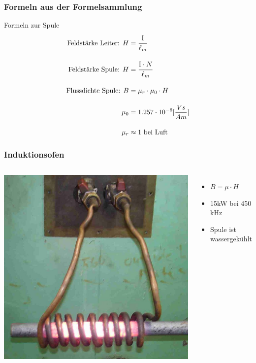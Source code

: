 \begin{frame}
  \frametitle{Formeln aus der Formelsammlung}
  \begin{block}{Formeln zur Spule}
    \begin{align*}
      \text{Feldstärke Leiter: } H &= \cfrac{\mathrm{I}}{\ell_m} \\[1em]
      \text{Feldstärke Spule: } H &= \cfrac{\mathrm{I} \cdot N}{\ell_m} \\[1em]
      \text{Flussdichte Spule: } B &= \mu_r \cdot \mu_0 \cdot H \\[1em]
      \mu_0 &= 1.257 \cdot 10^{-6}[\frac{Vs}{Am}] \\[1em]
      \mu_r &\approx 1 \text{ bei Luft}
    \end{align*}
  \end{block}
\end{frame}

\begin{frame}
  \frametitle{Induktionsofen}
  \begin{columns}[c]
    \includegraphics[width=\textwidth,height=.85\textheight,keepaspectratio]{a08/Induction_heating_of_bar_crop.jpg}\\
    {\tiny \hyperlink{refs}{\cite{wm}}} \\[1em]
    \begin{itemize}
      \item $B = \mu \cdot H$ %
      \item 15kW bei 450 kHz
      \item Spule ist wassergekühlt
    \end{itemize}
  \end{columns}
\end{frame}

